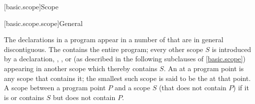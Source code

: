 [basic.scope]{Scope}%

[basic.scope.scope]{General}

\pnum
The declarations in a program appear in a number of 
that are in general discontiguous.
The  contains the entire program;
every other scope $S$ is introduced by a
declaration,
,
, or 
(as described in the following subclauses of \ref{basic.scope})
appearing in another scope which thereby contains $S$.
An  at a program point is any scope that contains it;
the smallest such scope is said to be the 
at that point.
A scope 
between a program point $P$ and a scope $S$
(that does not contain $P$) if it is or contains $S$ but does not contain $P$.

